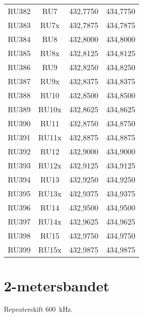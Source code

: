 \begin{tabular}{ r | c | l | l }
	RU382 & RU7   & 432,7750       & 434,7750       \\
	RU383 & RU7x  & 432,7875       & 434,7875       \\
	RU384 & RU8   & 432,8000       & 434,8000       \\
	RU385 & RU8x  & 432,8125       & 434,8125       \\
	RU386 & RU9   & 432,8250       & 434,8250       \\
	RU387 & RU9x  & 432,8375       & 434,8375       \\
	RU388 & RU10  & 432,8500       & 434,8500       \\
	RU389 & RU10x & 432,8625       & 434,8625       \\
	RU390 & RU11  & 432,8750       & 434,8750       \\
	RU391 & RU11x & 432,8875       & 434,8875       \\
	RU392 & RU12  & 432,9000       & 434,9000       \\
	RU393 & RU12x & 432,9125       & 434,9125       \\
	RU394 & RU13  & 432,9250       & 434,9250       \\
	RU395 & RU13x & 432,9375       & 434,9375       \\
	RU396 & RU14  & 432,9500       & 434,9500       \\
	RU397 & RU14x & 432,9625       & 434,9625       \\
	RU398 & RU15  & 432,9750       & 434,9750       \\
	RU399 & RU15x & 432,9875       & 434,9875       \\
\end{tabular}

\newpage

\section{2-metersbandet}
Repeaterskift \SI{600}{\kilo\hertz}.

